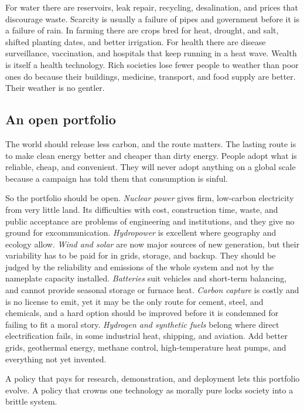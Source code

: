 \documentclass[12pt,a4paper]{book}
\begin{document}
For water there are reservoirs, leak repair, recycling, desalination, and prices that discourage waste. Scarcity is usually a failure of pipes and government before it is a failure of rain. In farming there are crops bred for heat, drought, and salt, shifted planting dates, and better irrigation. For health there are disease surveillance, vaccination, and hospitals that keep running in a heat wave. Wealth is itself a health technology. Rich societies lose fewer people to weather than poor ones do because their buildings, medicine, transport, and food supply are better. Their weather is no gentler.

\subsection{An open portfolio}

The world should release less carbon, and the route matters. The lasting route is to make clean energy better and cheaper than dirty energy. People adopt what is reliable, cheap, and convenient. They will never adopt anything on a global scale because a campaign has told them that consumption is sinful.

So the portfolio should be open. \emph{Nuclear power} gives firm, low-carbon electricity from very little land. Its difficulties with cost, construction time, waste, and public acceptance are problems of engineering and institutions, and they give no ground for excommunication. \emph{Hydropower} is excellent where geography and ecology allow. \emph{Wind and solar} are now major sources of new generation, but their variability has to be paid for in grids, storage, and backup. They should be judged by the reliability and emissions of the whole system and not by the nameplate capacity installed. \emph{Batteries} suit vehicles and short-term balancing, and cannot provide seasonal storage or furnace heat. \emph{Carbon capture} is costly and is no license to emit, yet it may be the only route for cement, steel, and chemicals, and a hard option should be improved before it is condemned for failing to fit a moral story. \emph{Hydrogen and synthetic fuels} belong where direct electrification fails, in some industrial heat, shipping, and aviation. Add better grids, geothermal energy, methane control, high-temperature heat pumps, and everything not yet invented.

A policy that pays for research, demonstration, and deployment lets this portfolio evolve. A policy that crowns one technology as morally pure locks society into a brittle system.
\end{document}
